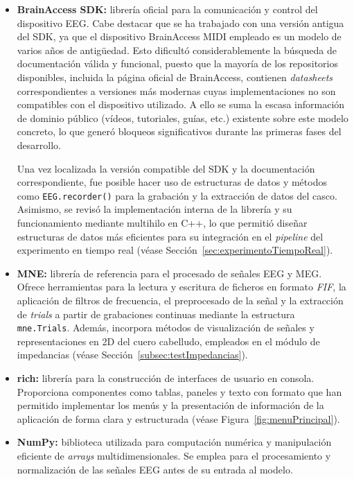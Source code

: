 \begin{itemize}

\item \textbf{BrainAccess SDK:} librería oficial para la comunicación y control del dispositivo EEG. Cabe destacar que se ha trabajado con una versión antigua del SDK, ya que el dispositivo BrainAccess MIDI empleado es un modelo de varios años de antigüedad. Esto dificultó considerablemente la búsqueda de documentación válida y funcional, puesto que la mayoría de los repositorios disponibles, incluida la página oficial de BrainAccess, contienen \textit{datasheets} correspondientes a versiones más modernas cuyas implementaciones no son compatibles con el dispositivo utilizado. A ello se suma la escasa información de dominio público (vídeos, tutoriales, guías, etc.) existente sobre este modelo concreto, lo que generó bloqueos significativos durante las primeras fases del desarrollo.

Una vez localizada la versión compatible del SDK y la documentación correspondiente, fue posible hacer uso de estructuras de datos y métodos como \texttt{EEG.recorder()} para la grabación y la extracción de datos del casco. Asimismo, se revisó la implementación interna de la librería y su funcionamiento mediante multihilo en C++, lo que permitió diseñar estructuras de datos más eficientes para su integración en el \textit{pipeline} del experimento en tiempo real (véase Sección~\ref{sec:experimentoTiempoReal}).

\item \textbf{MNE:} librería de referencia para el procesado de señales EEG y MEG. Ofrece herramientas para la lectura y escritura de ficheros en formato \textit{FIF}, la aplicación de filtros de frecuencia, el preprocesado de la señal y la extracción de \textit{trials} a partir de grabaciones continuas mediante la estructura \texttt{mne.Trials}. Además, incorpora métodos de visualización de señales y representaciones en 2D del cuero cabelludo, empleados en el módulo de impedancias (véase Sección~\ref{subsec:testImpedancias}).

\item \textbf{rich:} librería para la construcción de interfaces de usuario en consola. Proporciona componentes como tablas, paneles y texto con formato que han permitido implementar los menús y la presentación de información de la aplicación de forma clara y estructurada (véase Figura~\ref{fig:menuPrincipal}).

\item \textbf{NumPy:} biblioteca utilizada para computación numérica y manipulación eficiente de \textit{arrays} multidimensionales. Se emplea para el procesamiento y normalización de las señales EEG antes de su entrada al modelo.


\end{itemize}
